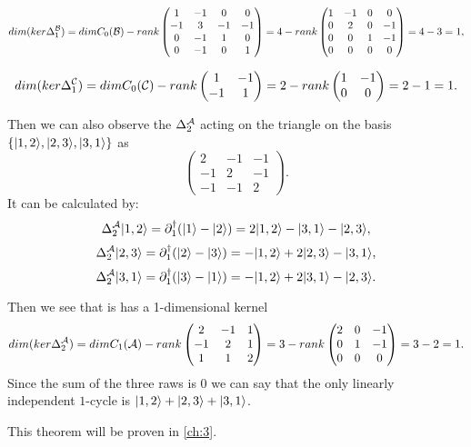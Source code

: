 \documentclass[../2.tex]{subfiles}
\begin{document}
{    \[ dim(ker\Delta_1^{\mathcal{B}}) =dimC_0(\mathcal{B}) - rank
    \begin{pmatrix}
        1 & -1 & 0 & 0  \\
        -1 & 3 & -1 & -1 \\
        0 & -1 & 1 & 0  \\
        0 & -1 & 0 & 1 
    \end{pmatrix} = 4 - rank
    \begin{pmatrix}
        1 & -1 & 0 & 0  \\
        0 & 2 & 0 & -1 \\
        0 & 0 & 1 & -1  \\
        0 & 0 & 0 & 0 
    \end{pmatrix} = 4 - 3 = 1,\]
    
    \[ dim(ker\Delta_1^{\mathcal{C}}) =dimC_0(\mathcal{C}) - rank
    \begin{pmatrix}
        1 & -1 \\
        -1 & 1
    \end{pmatrix} = 2 - rank
    \begin{pmatrix}
        1 & -1 \\
        0 & 0
    \end{pmatrix} = 2-1 = 1.\]
        
    Then we can also observe the $\Delta_2^{\mathcal{A}}$ acting on the triangle on the basis $\{| 1,2 \rangle,| 2,3 \rangle,| 3,1 \rangle\}$ as
    \[\begin{pmatrix}
        2 & -1 & -1  \\
        -1 & 2 & -1  \\
        -1& -1 & 2 
    \end{pmatrix}.\] 
    It can be calculated by:
    \[\Delta_2^{\mathcal{A}}| 1,2 \rangle = \partial_1^\dagger(| 1 \rangle-| 2 \rangle) = 2| 1,2 \rangle-| 3,1 \rangle-| 2,3 \rangle,\]
    \[\Delta_2^{\mathcal{A}}| 2,3 \rangle = \partial_1^\dagger(| 2 \rangle-| 3 \rangle) = -| 1,2 \rangle+2| 2,3 \rangle-| 3,1 \rangle,\]
    \[\Delta_2^{\mathcal{A}}| 3,1 \rangle = \partial_1^\dagger(| 3 \rangle-| 1 \rangle) = -| 1,2 \rangle+2| 3,1 \rangle-| 2,3 \rangle.\]




    Then we see that is has a 1-dimensional kernel
    \[ dim(ker\Delta_2^{\mathcal{A}}) = dimC_1(\mathcal{A}) - rank
        \begin{pmatrix}
            2 & -1 & 1  \\
            -1 & 2 & 1  \\
            1& 1 & 2 
        \end{pmatrix} = 3 - rank
        \begin{pmatrix}
            2 & 0 & -1  \\
            0 & 1 & -1  \\
            0 & 0 & 0 
        \end{pmatrix} = 3 - 2 =  1. \]
    Since the sum of the three raws is 0 we can say that the only linearly independent $1$-cycle is $| 1,2 \rangle+| 2,3 \rangle+| 3,1 \rangle$. 
    
    



        }

    This theorem will be proven in \autoref{ch:3}.
\end{document}
